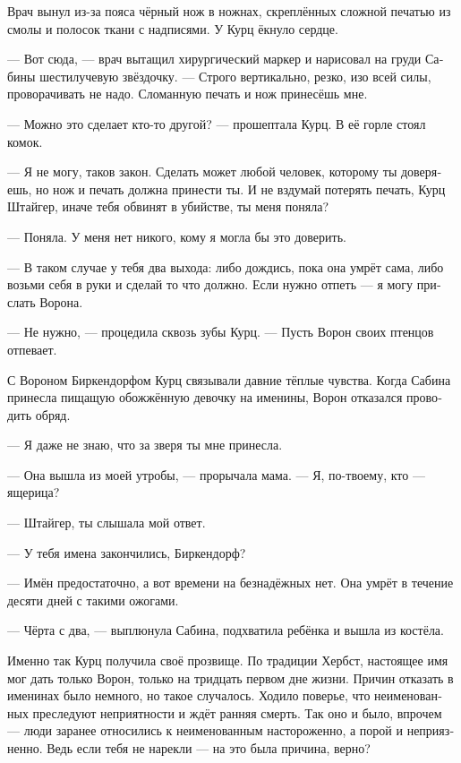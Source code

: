 \documentclass[a4paper,10pt,fleqn]{book}\usepackage{polyglossia}\setdefaultlanguage[babelshorthands=true]{russian}\setotherlanguage{english}\defaultfontfeatures{Ligatures=TeX,Mapping=tex-text}\usepackage{xcolor}\newcommand{\ml}[3]{#2}
\begin{document}
Врач вынул из-за пояса чёрный нож в ножнах, скреплённых сложной печатью из смолы и полосок ткани с надписями.
У Курц ёкнуло сердце.

--- Вот сюда, --- врач вытащил хирургический маркер и нарисовал на груди Сабины шестилучевую звёздочку.
--- Строго вертикально, резко, изо всей силы, проворачивать не надо.
Сломанную печать и нож принесёшь мне.

--- Можно это сделает кто-то другой? --- прошептала Курц.
В её горле стоял комок.

--- Я не могу, таков закон.
Сделать может любой человек, которому ты доверяешь, но нож и печать должна принести ты.
И не вздумай потерять печать, Курц Штайгер, иначе тебя обвинят в убийстве, ты меня поняла?

--- Поняла.
У меня нет никого, кому я могла бы это доверить.

--- В таком случае у тебя два выхода: либо дождись, пока она умрёт сама, либо возьми себя в руки и сделай то что должно.
\ml{$0$}
{Если нужно отпеть --- я могу прислать Ворона.}
{If she needs last rites, I'll send the Raben.''}

--- Не нужно, --- процедила сквозь зубы Курц.
\ml{$0$}
{--- Пусть Ворон своих птенцов отпевает.}
{``Let the Raben give last rites to his birdlings.''}

С Вороном Биркендорфом Курц связывали давние тёплые чувства.
Когда Сабина принесла пищащую обожжённую девочку на именины, Ворон отказался проводить обряд.

--- Я даже не знаю, что за зверя ты мне принесла.

\ml{$0$}
{--- Она вышла из моей утробы, --- прорычала мама.}
{``She came out of my womb,'' mama growled.}
\ml{$0$}
{--- Я, по-твоему, кто --- ящерица?}
{``Who do you think I am---a lizard?''}

\ml{$0$}
{--- Штайгер, ты слышала мой ответ.}
{``Steiger, you heard my answer.''}

\ml{$0$}
{--- У тебя имена закончились, Биркендорф?}
{``Are you out of names, Birkendorf?''}

\ml{$0$}
{--- Имён предостаточно, а вот времени на безнадёжных нет.}
{``I have plenty of names, I'm out of time for a lost cause.}
\ml{$0$}
{Она умрёт в течение десяти дней с такими ожогами.}
{She'll die in ten days with burns like those.''}

--- Чёрта с два, --- выплюнула Сабина, подхватила ребёнка и вышла из костёла.

Именно так Курц получила своё прозвище.
По традиции Хербст, настоящее имя мог дать только Ворон, только на тридцать первом дне жизни.
Причин отказать в именинах было немного, но такое случалось.
Ходило поверье, что неименованных преследуют неприятности и ждёт ранняя смерть.
Так оно и было, впрочем --- люди заранее относились к неименованным настороженно, а порой и неприязненно.
Ведь если тебя не нарекли --- на это была причина, верно?
\end{document}

